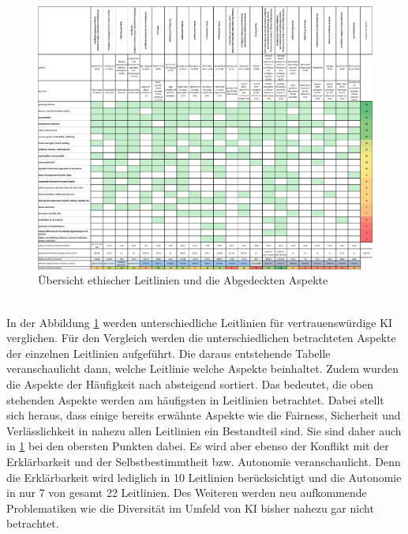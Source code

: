 \begin{onehalfspace}
        \begin{figure}[h]
            \centering
            \includegraphics[width = \textwidth]{Bilder/Ethical huidelines hagendorf 2020.png}
            \caption{Übersicht ethischer Leitlinien und die Abgedeckten Aspekte \cite{Hagendorff2020}}
            \label{fig:EthikGuidelines}
        \end{figure} \\
        In der Abbildung \ref*{fig:EthikGuidelines} werden unterschiedliche Leitlinien für vertrauenswürdige \ac*{KI} verglichen. Für den Vergleich werden die unterschiedlichen betrachteten Aspekte der einzelnen Leitlinien aufgeführt. Die daraus entstehende Tabelle veranschaulicht dann, welche Leitlinie welche Aspekte beinhaltet. Zudem wurden die Aspekte der Häufigkeit nach absteigend sortiert. Das bedeutet, die oben stehenden Aspekte werden am häufigsten in Leitlinien betrachtet. Dabei stellt sich heraus, dass einige bereits erwähnte Aspekte wie die Fairness, Sicherheit und Verlässlichkeit in nahezu allen Leitlinien ein Bestandteil sind. Sie sind daher auch in \ref*{fig:EthikGuidelines} bei den obersten Punkten dabei. Es wird aber ebenso der Konflikt mit der Erklärbarkeit und der Selbstbestimmtheit bzw. Autonomie veranschaulicht. Denn die Erklärbarkeit wird lediglich in 10 Leitlinien berücksichtigt und die Autonomie in nur 7 von gesamt 22 Leitlinien. Des Weiteren werden neu aufkommende Problematiken wie die Diversität im Umfeld von \ac*{KI} bisher nahezu gar nicht betrachtet.\cite{Hagendorff2020}\cite{jobin2019global} 
        \\

\end{onehalfspace}
